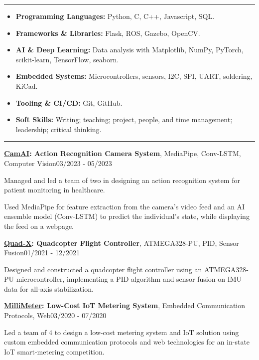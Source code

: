 \documentclass[11pt, a4paper]{article}
\newcommand{\entrytitle}[3]{
    \noindent\textbf{#1}, #2\hfill#3
}
\newcommand{\sectiontitle}[1]{\vspace{1mm}{\color{primaryColor}\noindent\textbf{#1}}\vspace{1.5mm}\hrule\vspace{1mm}}
\begin{document}
\sectiontitle{Skills}
\begin{itemize}
    \item \textbf{Programming Languages:} Python, C, C++, Javascript, SQL.
    \item \textbf{Frameworks \& Libraries:} Flask, ROS, Gazebo, OpenCV.
    \item \textbf{AI \& Deep Learning:} Data analysis with Matplotlib, NumPy, PyTorch, scikit-learn, TensorFlow, seaborn.
    \item \textbf{Embedded Systems:} Microcontrollers, sensors, I2C, SPI, UART, soldering, KiCad.
    \item \textbf{Tooling \& CI/CD:} Git, GitHub.
    \item \textbf{Soft Skills:} Writing; teaching; project, people, and time management; leadership; critical thinking.
\end{itemize}



\sectiontitle{Selected Projects}

\entrytitle{\href{https://www.nelsonelijah.com/projects/camai}{CamAI}: Action Recognition Camera System}{MediaPipe, Conv-LSTM, Computer Vision}{03/2023 - 05/2023}
\begin{details}
    \item Managed and led a team of two in designing an action recognition system for patient monitoring in healthcare.
    \item Used MediaPipe for feature extraction from the camera's video feed and an AI ensemble model (Conv-LSTM) to predict the individual's state, while displaying the feed on a webpage.
\end{details}

\entrytitle{\href{https://www.nelsonelijah.com/projects/myquad}{Quad-X}: Quadcopter Flight Controller}{ATMEGA328-PU, PID, Sensor Fusion}{01/2021 - 12/2021}
\begin{details}
    \item Designed and constructed a quadcopter flight controller using an ATMEGA328-PU microcontroller, implementing a PID algorithm and sensor fusion on IMU data for all-axis stabilization.
\end{details}

\entrytitle{\href{https://www.nelsonelijah.com/projects/iot-smart-electronic-meter}{MilliMeter}: Low-Cost IoT Metering System}{Embedded Communication Protocols, Web}{03/2020 - 07/2020}
\begin{details}
    \item Led a team of 4 to design a low-cost metering system and IoT solution using custom embedded communication protocols and web technologies for an in-state IoT smart-metering competition.
\end{details}
\end{document}
